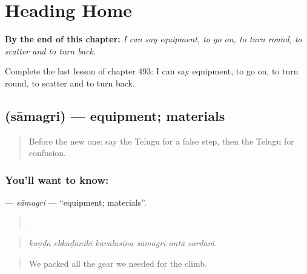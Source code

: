 
\chapter{Heading Home}
\label{ch:te-heading-home}

\begin{chapteropening}
\textbf{By the end of this chapter:} \emph{I can say equipment, to go on, to turn round, to scatter and to turn back.}

Complete the last lesson of chapter 493: I can say equipment, to go on, to turn round, to scatter and to turn back.
\end{chapteropening}

\section[\texorpdfstring{\te{సామగ్రి} (sāmagri)}{సామగ్రి (sāmagri)}]{ (sāmagri) — equipment; materials}

\label{lesson:TE-C493-samagri}



\begin{quote}
Before the new one: say the Telugu for a false step, then the Telugu for confusion.
\end{quote}

\subsection*{You'll want to know: }
\textbf{} — \emph{sāmagri} — \textquotedblleft{}equipment; materials\textquotedblright{}.

\begin{quote}
     .
\end{quote}

\begin{quote}
\emph{koṇḍa ekkaḍāniki kāvalasina sāmagri antā sardāṁ.}
\end{quote}

\begin{quote}
We packed all the gear we needed for the climb.
\end{quote}

